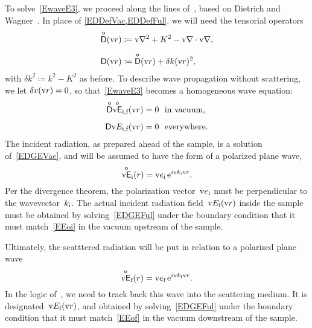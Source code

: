 To solve~\cref{EwaveE3}, we proceed along the lines of~,
based on Dietrich and Wagner~\cite{DiWa84}.
In place of \cref{EDDefVac,EDDefFul}, we will need the tensorial operators
\begin{align}
    \mathsf{\overset{o}{D}}(\text{v}{r}) &\coloneqq \text{v}{\nabla}^2+K^2-\text{v}{\nabla}\cdot\text{v}{\nabla}, \\[1.2ex]
    \mathsf{D}(\text{v}{r})  &\coloneqq \mathsf{\overset{o}{D}}(\text{v}{r}) + \delta k(\text{v}{r})^2,
\end{align}
with $\delta k^2\coloneqq k^2-K^2$ as before.
To describe wave propagation without scattering,
we let $\delta v(\text{v}{r})=0$,
so that~\cref{EwaveE3} becomes a homogeneous wave equation:
\begin{align}
    \mathsf{\overset{o}{D}}\mathsf{\overset{o}{\text{v}{E}}}_{\text{i,f}}  (\text{v}{r}) = 0 &\text{\strut~~in vacuum,} \label{EDGEVac}\\[1.2ex]
    \mathsf{D}\text{v}{E}_{\text{i,f}}(\text{v}{r}) = 0 &\text{\strut~~everywhere}. \label{EDGEFul}
\end{align}
The incident radiation, as prepared ahead of the sample, is a solution of~\cref{EDGEVac},
and will be assumed to have the form of a polarized plane wave,
\begin{equation}\label{EEoi}
   \mathsf{\overset{o}{\text{v}{E}}}_{\text{i}}(r) = \text{v}{e}_{\text{i}}\, \mathrm e^{i\text{v}{k}_{\text{i}}\text{v}{r}}.
\end{equation}
Per the divergence theorem,
the polarization vector~$\text{v}{e}_{\text{i}}$ must be perpendicular to the wavevector~$k_{\text{i}}$.
The actual incident radiation field~$\text{v}{E}_{\text{i}}(\text{v}{r})$ inside the sample
must be obtained by solving~\cref{EDGEFul}
under the boundary condition that it must match~\cref{EEoi}
in the vacuum upstream of the sample.

Ultimately, the scatttered radiation will be put in relation to
a polarized plane wave
\begin{equation}\label{EEof}
   \mathsf{\overset{o}{\text{v}{E}}}_{\text{f}}(r) = \text{v}{e}_{\text{f}}\, \mathrm e^{i\text{v}{k}_{\text{f}}\text{v}{r}}.
\end{equation}
In the logic of~,
we need to track back this wave into the scattering medium.
It is designated~$\text{v}{E}_{\text{f}}(\text{v}{r})$, and obtained by solving~\cref{EDGEFul} under
the boundary condition that it must match~\cref{EEof}
in the vacuum downstream of the sample.

